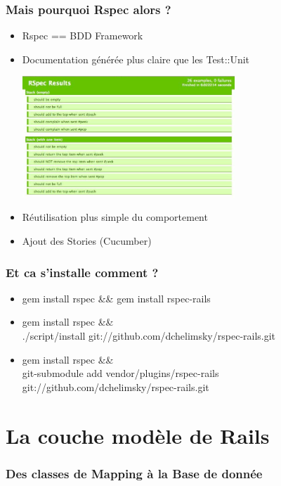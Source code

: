 \documentclass{beamer}
\begin{document}
\begin{frame}
    \frametitle{Mais pourquoi Rspec alors ?}
    \begin{itemize}
        \item Rspec == BDD Framework
        \item Documentation g\'en\'er\'ee plus claire que les Test::Unit
            \begin{center}
                \includegraphics[width=80mm]{rspec-example} 
            \end{center}
        \item R\'eutilisation plus simple du comportement
        \item Ajout des Stories (Cucumber)
    \end{itemize}
\end{frame}

\begin{frame}
    \frametitle{Et ca s'installe comment ?}
    \begin{itemize}
        \item gem install rspec \&\& gem install rspec-rails
        \item gem install rspec \&\& \\
            ./script/install git://github.com/dchelimsky/rspec-rails.git
        \item gem install rspec \&\& \\
            git-submodule add vendor/plugins/rspec-rails git://github.com/dchelimsky/rspec-rails.git
    \end{itemize}
\end{frame}

\section{La couche mod\`ele de Rails}

\begin{frame}
    \frametitle{Des classes de Mapping à la Base de donn\'ee}
    \begin{center}
        
    \end{center}
\end{frame}
\end{document}
